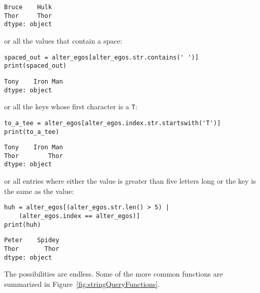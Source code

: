 \begin{Verbatim}[fontsize=\small,samepage=true,frame=leftline,framesep=5mm,framerule=1mm]
Bruce    Hulk
Thor     Thor
dtype: object
\end{Verbatim}

or all the values that contain a space:

\begin{Verbatim}[fontsize=\small,samepage=true,frame=single,framesep=3mm]
spaced_out = alter_egos[alter_egos.str.contains(' ')]
print(spaced_out)
\end{Verbatim}
\vspace{-.3in}

\begin{Verbatim}[fontsize=\small,samepage=true,frame=leftline,framesep=5mm,framerule=1mm]
Tony    Iron Man
dtype: object
\end{Verbatim}

or all the keys whose first character is a \texttt{T}:

\begin{Verbatim}[fontsize=\footnotesize,samepage=true,frame=single,framesep=3mm]
to_a_tee = alter_egos[alter_egos.index.str.startswith('T')]
print(to_a_tee)
\end{Verbatim}
\vspace{-.3in}

\begin{Verbatim}[fontsize=\small,samepage=true,frame=leftline,framesep=5mm,framerule=1mm]
Tony    Iron Man
Thor        Thor
dtype: object
\end{Verbatim}

or all entries where either the value is greater than five letters long or the
key is the same as the value:

\begin{Verbatim}[fontsize=\small,samepage=true,frame=single,framesep=3mm]
huh = alter_egos[(alter_egos.str.len() > 5) |
    (alter_egos.index == alter_egos)]
print(huh)
\end{Verbatim}
\vspace{-.3in}

\begin{Verbatim}[fontsize=\small,samepage=true,frame=leftline,framesep=5mm,framerule=1mm]
Peter    Spidey
Thor       Thor
dtype: object
\end{Verbatim}

The possibilities are endless. Some of the more common functions are summarized
in Figure~\ref{fig:stringQueryFunctions}.

